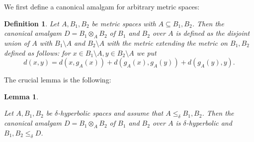 \documentclass{amsart}
\renewcommand{\d}{\delta}
\newtheorem{definition}[defi]{Definition}
\newtheorem{lemma}[defi]{Lemma}
\begin{document}
We first define a canonical amalgam for arbitrary metric spaces:
\begin{definition}\label{def:canonical amalgam}
Let $A, B_1, B_2$ be metric spaces with $A\subseteq B_1,B_2$. Then 
the \emph{canonical amalgam} $D=B_1\otimes_AB_2$ of $B_1$ and $B_2$ over $A$  is defined as the disjoint union of $A$ with $B_1\setminus A$ and $B_2\setminus A$ with the metric extending the metric on $B_1, B_2$ defined as follows: for $x\in B_1\setminus A, y\in B_2\setminus A$ we put 
\[d(x,y)=d(x, g_A(x))+d(g_A(x),g_A(y))+d(g_A(y),y).\] 
\end{definition}
The crucial lemma is the following:
\begin{lemma}\label{lem:amalgamation}

Let $A, B_1, B_2$ be $\d$-hyperbolic spaces and assume that $A\leq_\d B_1,B_2$. Then 
the canonical amalgam $D=B_1\otimes_AB_2$ of $B_1$ and $B_2$ over $A$ is $\d$-hyperbolic and $B_1,B_2\leq_\d D$.
\end{lemma}
\end{document}
